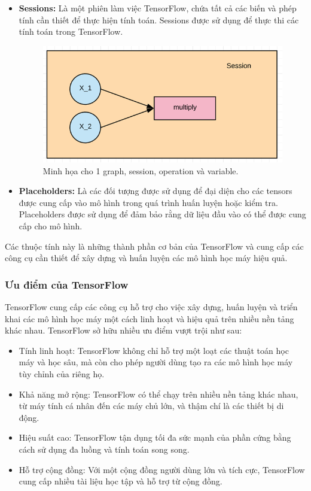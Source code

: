 \begin{itemize}
    \item \textbf{Sessions:} Là một phiên làm việc TensorFlow, chứa tất cả các biến và phép tính cần thiết để thực hiện tính toán. Sessions được sử dụng để thực thi các tính toán trong TensorFlow.
    \begin{figure}[H]
        \centering
        \includegraphics[width=\textwidth,height=\textheight,keepaspectratio]{Images/Theoretical basis/083018_0508_WhatisTenso2.png}
        \caption{Minh họa cho 1 graph, session, operation và variable.}
        \label{fig:enter-label}
    \end{figure}
    \item \textbf{Placeholders:} Là các đối tượng được sử dụng để đại diện cho các tensors được cung cấp vào mô hình trong quá trình huấn luyện hoặc kiểm tra. Placeholders được sử dụng để đảm bảo rằng dữ liệu đầu vào có thể được cung cấp cho mô hình.
\end{itemize}

Các thuộc tính này là những thành phần cơ bản của TensorFlow và cung cấp các công cụ cần thiết để xây dựng và huấn luyện các mô hình học máy hiệu quả.

\subsubsection{Ưu điểm của TensorFlow}
\indent TensorFlow cung cấp các công cụ hỗ trợ cho việc xây dựng, huấn luyện và triển khai các mô hình học máy một cách linh hoạt và hiệu quả trên nhiều nền tảng khác nhau. TensorFlow sở hữu nhiều ưu điểm vượt trội như sau:
\begin{itemize}
    \item Tính linh hoạt: TensorFlow không chỉ hỗ trợ một loạt các thuật toán học máy và học sâu, mà còn cho phép người dùng tạo ra các mô hình học máy tùy chỉnh của riêng họ.
    \item Khả năng mở rộng: TensorFlow có thể chạy trên nhiều nền tảng khác nhau, từ máy tính cá nhân đến các máy chủ lớn, và thậm chí là các thiết bị di động.
    \item Hiệu suất cao: TensorFlow tận dụng tối đa sức mạnh của phần cứng bằng cách sử dụng đa luồng và tính toán song song.
    \item Hỗ trợ cộng đồng: Với một cộng đồng người dùng lớn và tích cực, TensorFlow cung cấp nhiều tài liệu học tập và hỗ trợ từ cộng đồng.
\end{itemize}

